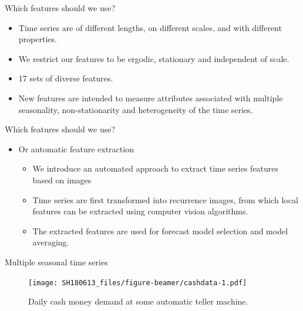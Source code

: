 \documentclass[11pt,ignorenonframetext,compress]{beamer}
\providecommand{\tightlist}{%
  \setlength{\itemsep}{0pt}\setlength{\parskip}{0pt}}
\begin{document}
\begin{frame}{Which features should we use?}

  \begin{itemize}
    \tightlist
  \item
    Time series are of different lengths, on different scales, and with
    different properties.
  \item
    We restrict our features to be ergodic, stationary and independent of
    scale.
  \item
    17 sets of diverse features.
  \item
    New features are intended to measure attributes associated with
    multiple seasonality, non-stationarity and heterogeneity of the time
    series.
  \end{itemize}

\end{frame}


\begin{frame}{Which features should we use?}

  \begin{itemize}
  \item Or automatic feature extraction

    \begin{itemize}
    \item We introduce an automated approach to extract time series features based on
      images
    \item Time series are first transformed into recurrence images, from which local
      features can be extracted using computer vision algorithms.
    \item The extracted features are used for forecast model selection and model
      averaging.
    \end{itemize}

  \end{itemize}

\end{frame}

\begin{frame}{Multiple seasonal time series}

  \begin{figure}
    \centering
    \texttt{[image: SH180613\_files/figure-beamer/cashdata-1.pdf]}
    \caption{Daily cash money demand at some automatic teller machine.}
  \end{figure}

\end{frame}
\end{document}
